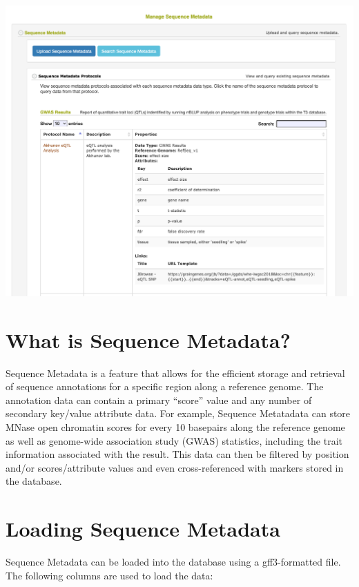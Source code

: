 \documentclass[
  12pt,
]{book}
\begin{document}
\begin{center}\includegraphics[width=0.95\linewidth]{assets/images/sequence_metadata_manage} \end{center}

\hypertarget{what-is-sequence-metadata}{%
\section{What is Sequence Metadata?}\label{what-is-sequence-metadata}}

Sequence Metadata is a feature that allows for the efficient storage and retrieval of sequence annotations for a specific region along a reference genome. The annotation data can contain a primary ``score'' value and any number of secondary key/value attribute data. For example, Sequence Metatadata can store MNase open chromatin scores for every 10 basepairs along the reference genome as well as genome-wide association study (GWAS) statistics, including the trait information associated with the result. This data can then be filtered by position and/or scores/attribute values and even cross-referenced with markers stored in the database.

\hypertarget{loading-sequence-metadata}{%
\section{Loading Sequence Metadata}\label{loading-sequence-metadata}}

Sequence Metadata can be loaded into the database using a gff3-formatted file. The following columns are used to load the data:
\end{document}

